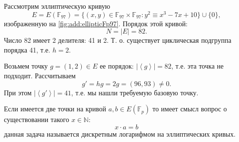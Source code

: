 


\begin{example}
\label{ex:add:elliptic:basepoint}
Рассмотрим эллиптическую кривую 
\[
E = E\left(\mathbb{F}_{97}\right) = 
\{(x,y) \in \mathbb{F}_{97} \times \mathbb{F}_{97}: y^2 \equiv x^3 -7 x + 10 \} \cup \{0\},
\] 
изображенную на \autoref{fig:add:ellipticFp97}. Порядок этой кривой:
\[
N = \left|E\right| = 82.
\]
Число 82 имеет 2 делителя: 41 и 2. Т. о. существует циклическая
подгруппа порядка 41, т.е. $h = 2$. 

Возьмем точку $g = (1,2) \in E$ ее порядок:
$\left|\left<g\right>\right| = 82$, т.е. эта точка не подходит. 
Рассчитываем 
\[
g' = h g = 2 g = (96,93) \ne 0.
\]
При этом $\left|\left<g'\right>\right| = 41$, т.е. мы нашли требуемую
базовую точку.
\end{example}

Если имеется две точки на кривой $a, b \in E\left(\mathbb{F}_p\right)$
то имеет смысл вопрос о существовании такого $x \in \mathbb{N}$:
\[
x \cdot a = b
\]
данная задача называется дискретным логарифмом на эллиптических
кривых. 

